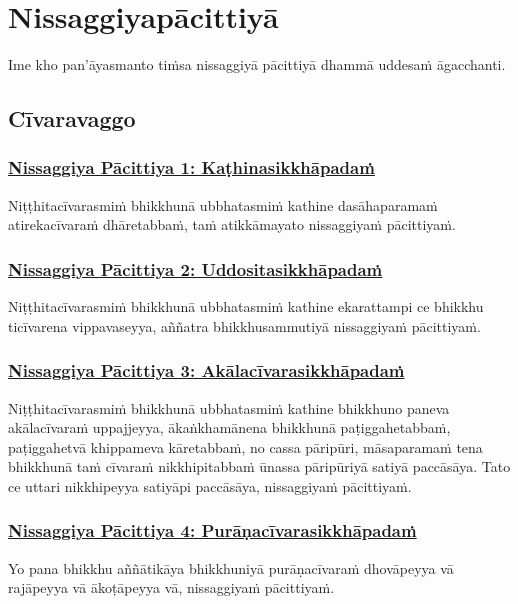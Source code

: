 \section{Nissaggiyapācittiyā}
\label{np}

\begin{intro}
  Ime kho pan'āyasmanto tiṁsa nissaggiyā pācittiyā dhammā uddesaṁ āgacchanti.
\end{intro}

\setsubsecheadstyle{\subsectionFmt}
\subsection{Cīvaravaggo}
\vspace{0.2cm}

\subsubsection*{\hyperref[forf-exp1]{Nissaggiya Pācittiya 1: Kaṭhinasikkhāpadaṁ}}
\label{np1}
Niṭṭhitacīvarasmiṁ bhikkhunā ubbhatasmiṁ kathine dasāhaparamaṁ atirekacīvaraṁ dhāretabbaṁ, taṁ atikkāmayato nissaggiyaṁ pācittiyaṁ.

\subsubsection*{\hyperref[forf-exp2]{Nissaggiya Pācittiya 2: Uddositasikkhāpadaṁ}}
\label{np2}
Niṭṭhitacīvarasmiṁ bhikkhunā ubbhatasmiṁ kathine ekarattampi ce bhikkhu ticīvarena vippavaseyya, aññatra bhikkhusammutiyā nissaggiyaṁ pācittiyaṁ.

\subsubsection*{\hyperref[forf-exp3]{Nissaggiya Pācittiya 3: Akālacīvarasikkhāpadaṁ}}
\label{np3}
Niṭṭhitacīvarasmiṁ bhikkhunā ubbhatasmiṁ kathine bhikkhuno paneva akālacīvaraṁ uppajjeyya, ākaṅkhamānena bhikkhunā paṭiggahetabbaṁ, paṭiggahetvā khippameva kāretabbaṁ, no cassa pāripūri, māsaparamaṁ tena bhikkhunā taṁ cīvaraṁ nikkhipitabbaṁ ūnassa pāripūriyā satiyā paccāsāya. Tato ce uttari nikkhipeyya satiyāpi paccāsāya, nissaggiyaṁ pācittiyaṁ.

\subsubsection*{\hyperref[forf-exp4]{Nissaggiya Pācittiya 4: Purāṇacīvarasikkhāpadaṁ}}
\label{np4}
Yo pana bhikkhu aññātikāya bhikkhuniyā purāṇacīvaraṁ dhovāpeyya vā rajāpeyya vā ākoṭāpeyya vā, nissaggiyaṁ pācittiyaṁ.

